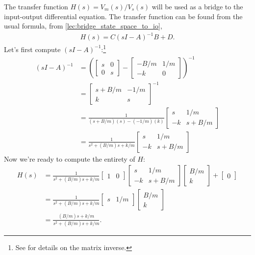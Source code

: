 \documentclass[dynamic_systems.tex]{subfiles}
\begin{document}
The transfer function $H(s) = V_m(s)/V_s(s)$ will be used as a bridge to the input-output differential equation.
The transfer function can be found from the usual formula, from
\tags{}
\autoref{lec:bridge_state_space_to_io},
\begin{align}
	H(s) = C(sI - A)^{-1}B + D.
\end{align}
Let's first compute $(sI - A)^{-1}$:\footnote{See \cite[Sec.~A.4.3]{Rowell1997} for details on the matrix inverse.}
\begin{subequations}
\begin{align}
	(sI - A)^{-1} &= \left(
		\begin{bmatrix}
			s & 0 \\
			0 & s
		\end{bmatrix}
		-
		\begin{bmatrix}
			-B/m & 1/m \\
			-k & 0
		\end{bmatrix}
	\right)^{-1} \\
	&=
		\begin{bmatrix}
			s+B/m & -1/m \\
			k & s
		\end{bmatrix}^{-1} \\
	&=
		\frac{1}{(s+B/m)(s)-(-1/m)(k)}
		\begin{bmatrix}
			s & 1/m \\
			-k & s+B/m 
		\end{bmatrix} \\
	&=
		\frac{1}{s^2+(B/m) s + k/m}
		\begin{bmatrix}
			s & 1/m \\
			-k & s+B/m 
		\end{bmatrix}
\end{align}
\end{subequations}
Now we're ready to compute the entirety of $H$:
\begin{subequations}
\begin{align}
	H(s) &= 
		\frac{1}{s^2+(B/m) s + k/m}
		\begin{bmatrix}
			1 & 0
		\end{bmatrix}
		\begin{bmatrix}
			s & 1/m \\
			-k & s+B/m 
		\end{bmatrix}
		\begin{bmatrix}
			B/m \\ k
		\end{bmatrix}
		+
		\begin{bmatrix}
			0
		\end{bmatrix} \\
	&= 
		\frac{1}{s^2+(B/m) s + k/m}
		\begin{bmatrix}
			s & 1/m
		\end{bmatrix}
		\begin{bmatrix}
			B/m \\ k
		\end{bmatrix} \\
	&= 
		\frac{(B/m) s + k/m}{s^2+(B/m) s + k/m}.
\end{align}
\end{subequations}
\end{document}
